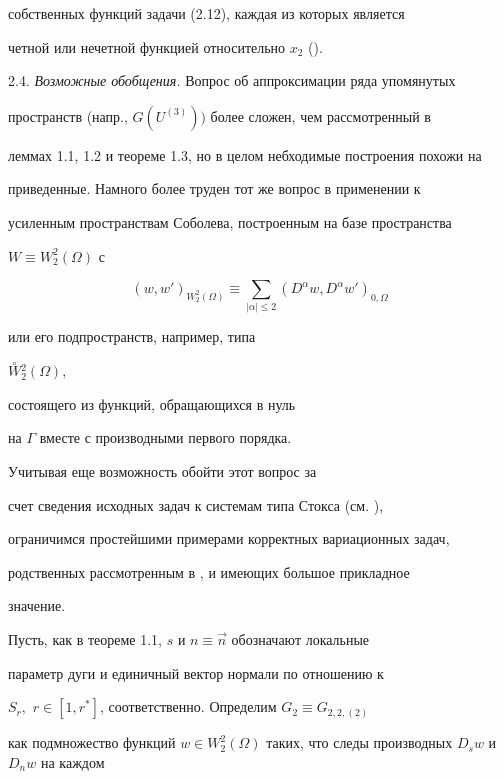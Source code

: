 собственных функций задачи (2.12), каждая из которых является


четной или нечетной функцией относительно $x_2$ (\cite{Dy2}).





2.4. {\it Возможные обобщения.} Вопрос об аппроксимации ряда упомянутых


пространств (напр., $G(U^{(3)}))$ более сложен, чем рас\-смо\-тренный в


леммах 1.1, 1.2 и теореме 1.3, но в целом небходимые построения похожи на


приведенные. Намного более труден тот же вопрос в применении к


усиленным пространствам Соболева, построенным на базе пространства


$W\equiv W_2^2 (\Omega)$ с


$$


(w,w')_{W_2^2 (\Omega)}\equiv \sum_{|\alpha|\le 2}


(D^{\alpha}w,D^{\alpha}w')_{0,\Omega}


$$


или его подпространств, например, типа


$\overset{\circ}W{}_2^2(\Omega),$


состоящего из функ\-ций, обращающихся в нуль


на $\Gamma$ вместе с производными первого по\-рядка.


Учитывая еще возможность обойти этот вопрос за


счет сведения исходных задач к системам типа Стокса (см. \cite{Dy2}),


ограничимся простейшими примерами корректных вариа\-ционных задач,


родственных рассмотренным в \cite{Vol}, \cite{Cou} и имеющих бо\-ль\-шое прикладное


значение.








Пусть, как в теореме 1.1, $s$ и $n\equiv \Vec n$ обозначают локальные


параметр дуги и единичный вектор нормали по отношению к


$S_r,$ $r\in[1,r^*]$, соответственно. Определим $G_2\equiv G_{2,2,(2)}$


 как подмножество функций $w\in


W_2^2(\Omega)$ таких, что следы производных $D_sw$ и $D_nw$ на каждом


